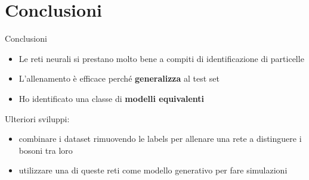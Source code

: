 \documentclass{beamer}
\begin{document}
\section{Conclusioni}
\begin{frame}{Conclusioni}
  \begin{itemize}
    \item Le reti neurali si prestano molto bene a compiti di identificazione di particelle
    \item L'allenamento è efficace perché \textbf{generalizza} al test set
    \item Ho identificato una classe di \textbf{modelli equivalenti}
  \end{itemize}
  \vspace{2ex}

  Ulteriori sviluppi: 
  \begin{itemize}
    \item combinare i dataset rimuovendo le labels per allenare una rete a distinguere i bosoni tra loro
    \item utilizzare una di queste reti come modello generativo per fare simulazioni 
  \end{itemize}
%
    \begin{columns}
      {
        \begin{block}{}
          \centering\vspace*{.5ex}
        \vspace*{.5ex}
      \end{block}
      }
    \end{columns}
\end{frame}
\end{document}
